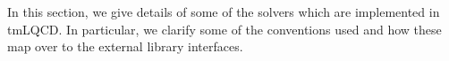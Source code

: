 In this section, we give details of some of the solvers which are implemented in tmLQCD.
In particular, we clarify some of the conventions used and how these map over to the external library interfaces.

